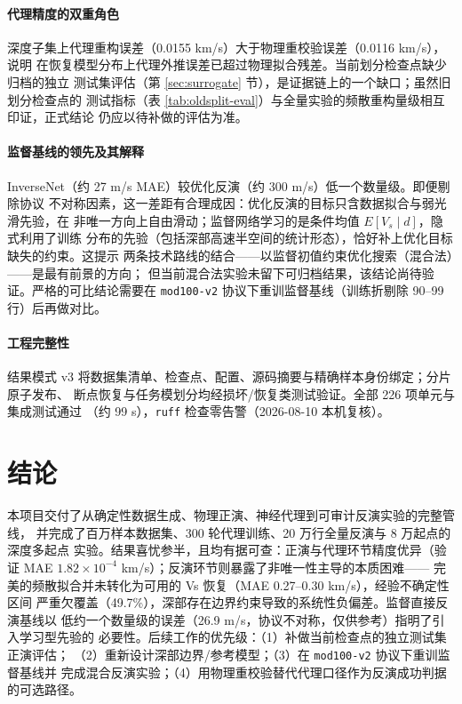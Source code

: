 \documentclass[UTF8,a4paper,11pt]{ctexart}
\begin{document}
\paragraph{代理精度的双重角色}
深度子集上代理重构误差（0.0155 km/s）大于物理重校验误差（0.0116 km/s），说明
在恢复模型分布上代理外推误差已超过物理拟合残差。当前划分检查点缺少归档的独立
测试集评估（第 \ref{sec:surrogate} 节），是证据链上的一个缺口；虽然旧划分检查点的
测试指标（表 \ref{tab:oldsplit-eval}）与全量实验的频散重构量级相互印证，正式结论
仍应以待补做的评估为准。

\paragraph{监督基线的领先及其解释}
InverseNet（约 27 m/s MAE）较优化反演（约 300 m/s）低一个数量级。即便剔除协议
不对称因素，这一差距有合理成因：优化反演的目标只含数据拟合与弱光滑先验，在
非唯一方向上自由滑动；监督网络学习的是条件均值 \(E[V_s\mid d]\)，隐式利用了训练
分布的先验（包括深部高速半空间的统计形态），恰好补上优化目标缺失的约束。这提示
两条技术路线的结合——以监督初值约束优化搜索（混合法）——是最有前景的方向；
但当前混合法实验未留下可归档结果，该结论尚待验证。严格的可比结论需要在
\texttt{mod100-v2} 协议下重训监督基线（训练折剔除 90--99 行）后再做对比。

\paragraph{工程完整性}
结果模式 v3 将数据集清单、检查点、配置、源码摘要与精确样本身份绑定；分片原子发布、
断点恢复与任务模划分均经损坏/恢复类测试验证。全部 226 项单元与集成测试通过
（约 99 s），\texttt{ruff} 检查零告警（2026-08-10 本机复核）。

\section{结论}\label{sec:conclusion}
本项目交付了从确定性数据生成、物理正演、神经代理到可审计反演实验的完整管线，
并完成了百万样本数据集、300 轮代理训练、20 万行全量反演与 8 万起点的深度多起点
实验。结果喜忧参半，且均有据可查：正演与代理环节精度优异（验证 MAE
\(1.82\times10^{-4}\) km/s）；反演环节则暴露了非唯一性主导的本质困难——
完美的频散拟合并未转化为可用的 Vs 恢复（MAE 0.27--0.30 km/s），经验不确定性区间
严重欠覆盖（49.7\%），深部存在边界约束导致的系统性负偏差。监督直接反演基线以
低约一个数量级的误差（26.9 m/s，协议不对称，仅供参考）指明了引入学习型先验的
必要性。后续工作的优先级：（1）补做当前检查点的独立测试集正演评估；
（2）重新设计深部边界/参考模型；（3）在 \texttt{mod100-v2} 协议下重训监督基线并
完成混合反演实验；（4）用物理重校验替代代理口径作为反演成功判据的可选路径。
\end{document}
